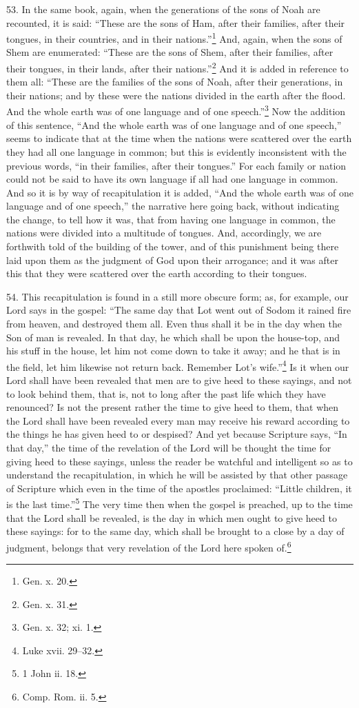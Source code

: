 53. In the same book, again, when the generations of the sons of Noah are recounted, it is said: “These are the sons of Ham, after their families, after their tongues, in their countries, and in their nations.”\footnote{Gen. x. 20.} And, again, when the sons of Shem are enumerated: “These are the sons of Shem, after their families, after their tongues, in their lands, after their nations.”\footnote{Gen. x. 31.} And it is added in reference to them all: “These are the families of the sons of Noah, after their generations, in their nations; and by these were the nations divided in the earth after the flood. And the whole earth was of one language and of one speech.”\footnote{Gen. x. 32; xi. 1.} Now the addition of this sentence, “And the whole earth was of one language and of one speech,” seems to indicate that at the time when the nations were scattered over the earth they had all one language in common; but this is evidently inconsistent with the previous words, “in their families, after their tongues.” For each family or nation could not be said to have its own language if all had one language in common. And so it is by way of recapitulation it is added, “And the whole earth was of one language and of one speech,” the narrative here going back, without indicating the change, to tell how it was, that from having one language in common, the nations were divided into a multitude of tongues. And, accordingly, we are forthwith told of the building of the tower, and of this punishment being there laid upon them as the judgment of God upon their arrogance; and it was after this that they were scattered over the earth according to their tongues.

54. This recapitulation is found in a still more obscure form; as, for example, our Lord says in the gospel: “The same day that Lot went out of Sodom it rained fire from heaven, and destroyed them all. Even thus shall it be in the day when the Son of man is revealed. In that day, he which shall be upon the house-top, and his stuff in the house, let him not come down to take it away; and he that is in the field, let him likewise not return back. Remember Lot’s wife.”\footnote{Luke xvii. 29–32.} Is it when our Lord shall have been revealed that men are to give heed to these sayings, and not to look behind them, that is, not to long after the past life which they have renounced? Is not the present rather the time to give heed to them, that when the Lord shall have been revealed every man may receive his reward according to the things he has given heed to  or despised? And yet because Scripture says, “In that day,” the time of the revelation of the Lord will be thought the time for giving heed to these sayings, unless the reader be watchful and intelligent so as to understand the recapitulation, in which he will be assisted by that other passage of Scripture which even in the time of the apostles proclaimed: “Little children, it is the last time.”\footnote{1 John ii. 18.} The very time then when the gospel is preached, up to the time that the Lord shall be revealed, is the day in which men ought to give heed to these sayings: for to the same day, which shall be brought to a close by a day of judgment, belongs that very revelation of the Lord here spoken of.\footnote{Comp. Rom. ii. 5.}

